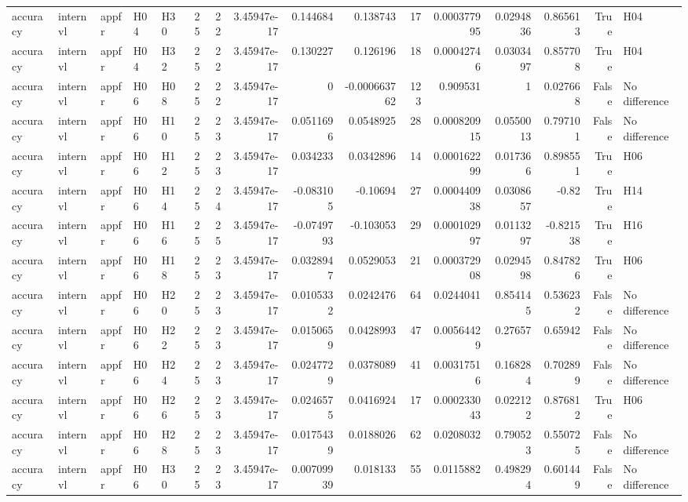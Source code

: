 \begin{longtable}{lllllrrrrrrrrrrl}
accuracy & internvl & appfr & H04 & H30 & 25 & 22 & 3.45947e-17 & 0.144684 & 0.138743 & 17 & 0.000377995 & 0.0294836 & 0.865613 & True & H04 \\
accuracy & internvl & appfr & H04 & H32 & 25 & 22 & 3.45947e-17 & 0.130227 & 0.126196 & 18 & 0.00042746 & 0.0303497 & 0.857708 & True & H04 \\
accuracy & internvl & appfr & H06 & H08 & 25 & 22 & 3.45947e-17 & 0 & -0.000663762 & 123 & 0.909531 & 1 & 0.027668 & False & No difference \\
accuracy & internvl & appfr & H06 & H10 & 25 & 23 & 3.45947e-17 & 0.0511696 & 0.0548925 & 28 & 0.000820915 & 0.0550013 & 0.797101 & False & No difference \\
accuracy & internvl & appfr & H06 & H12 & 25 & 23 & 3.45947e-17 & 0.034233 & 0.0342896 & 14 & 0.000162299 & 0.017366 & 0.898551 & True & H06 \\
accuracy & internvl & appfr & H06 & H14 & 25 & 24 & 3.45947e-17 & -0.083105 & -0.10694 & 27 & 0.000440938 & 0.0308657 & -0.82 & True & H14 \\
accuracy & internvl & appfr & H06 & H16 & 25 & 25 & 3.45947e-17 & -0.0749793 & -0.103053 & 29 & 0.000102997 & 0.0113297 & -0.821538 & True & H16 \\
accuracy & internvl & appfr & H06 & H18 & 25 & 23 & 3.45947e-17 & 0.0328947 & 0.0529053 & 21 & 0.000372908 & 0.0294598 & 0.847826 & True & H06 \\
accuracy & internvl & appfr & H06 & H20 & 25 & 23 & 3.45947e-17 & 0.0105332 & 0.0242476 & 64 & 0.0244041 & 0.854145 & 0.536232 & False & No difference \\
accuracy & internvl & appfr & H06 & H22 & 25 & 23 & 3.45947e-17 & 0.0150659 & 0.0428993 & 47 & 0.00564429 & 0.27657 & 0.65942 & False & No difference \\
accuracy & internvl & appfr & H06 & H24 & 25 & 23 & 3.45947e-17 & 0.0247729 & 0.0378089 & 41 & 0.00317516 & 0.168284 & 0.702899 & False & No difference \\
accuracy & internvl & appfr & H06 & H26 & 25 & 23 & 3.45947e-17 & 0.0246575 & 0.0416924 & 17 & 0.000233043 & 0.022122 & 0.876812 & True & H06 \\
accuracy & internvl & appfr & H06 & H28 & 25 & 23 & 3.45947e-17 & 0.0175439 & 0.0188026 & 62 & 0.0208032 & 0.790523 & 0.550725 & False & No difference \\
accuracy & internvl & appfr & H06 & H30 & 25 & 23 & 3.45947e-17 & 0.00709939 & 0.018133 & 55 & 0.0115882 & 0.498294 & 0.601449 & False & No difference \\

\end{longtable}
